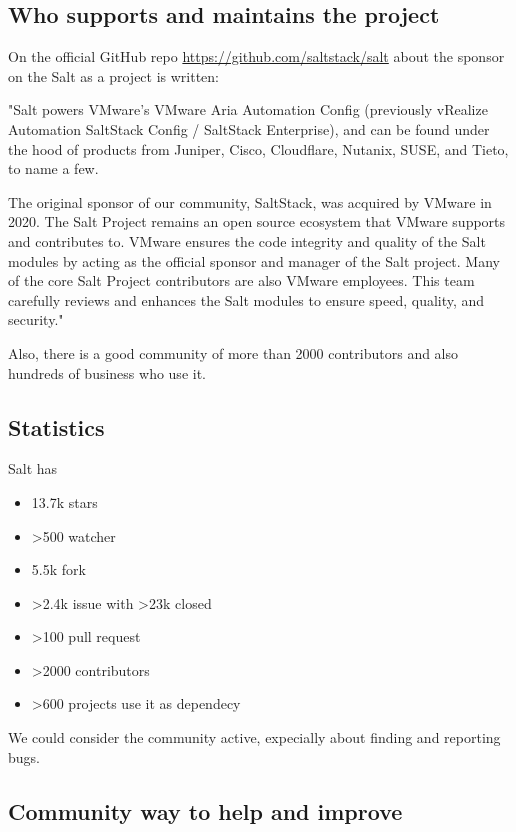\documentclass[12pt,a4paper,openright,twoside]{book}
\begin{document}
\subsection{Who supports and maintains the project}
On the official GitHub repo \url{https://github.com/saltstack/salt} about the sponsor on the Salt as a project is written:


"Salt powers VMware's VMware Aria Automation Config (previously vRealize Automation SaltStack Config / SaltStack Enterprise), and can be found under the hood of products from Juniper, Cisco, Cloudflare, Nutanix, SUSE, and Tieto, to name a few.


The original sponsor of our community, SaltStack, was acquired by VMware in 2020. The Salt Project remains an open source ecosystem that VMware supports and contributes to. VMware ensures the code integrity and quality of the Salt modules by acting as the official sponsor and manager of the Salt project. Many of the core Salt Project contributors are also VMware employees. This team carefully reviews and enhances the Salt modules to ensure speed, quality, and security."\cite{saltGitHub}


Also, there is a good community of more than 2000 contributors and also hundreds of business who use it.

\subsection{Statistics}
Salt has 
\begin{itemize}
    \item 13.7k stars
    \item >500 watcher
    \item 5.5k fork
    \item >2.4k issue with >23k closed
    \item >100 pull request
    \item >2000 contributors
    \item >600 projects use it as dependecy
\end{itemize}

We could consider the community active, expecially about finding and reporting bugs.

\subsection{Community way to help and improve}
\end{document}
